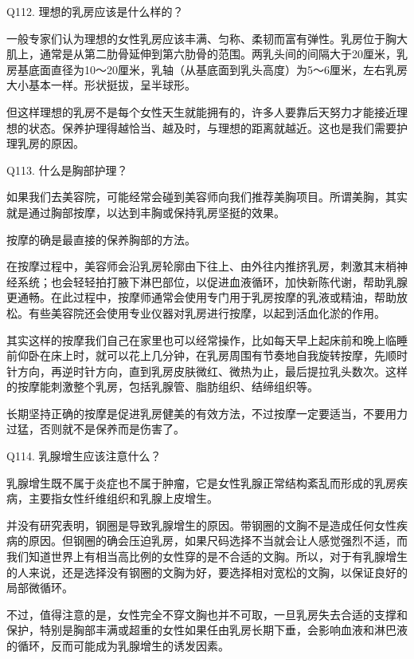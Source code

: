 \documentclass[12pt,UTF8]{ctexbook}
\begin{document}
Q112. 理想的乳房应该是什么样的？


一般专家们认为理想的女性乳房应该丰满、匀称、柔韧而富有弹性。乳房位于胸大肌上，通常是从第二肋骨延伸到第六肋骨的范围。两乳头间的间隔大于20厘米，乳房基底面直径为10～20厘米，乳轴（从基底面到乳头高度）为5～6厘米，左右乳房大小基本一样。形状挺拔，呈半球形。

但这样理想的乳房不是每个女性天生就能拥有的，许多人要靠后天努力才能接近理想的状态。保养护理得越恰当、越及时，与理想的距离就越近。这也是我们需要护理乳房的原因。





Q113. 什么是胸部护理？


如果我们去美容院，可能经常会碰到美容师向我们推荐美胸项目。所谓美胸，其实就是通过胸部按摩，以达到丰胸或保持乳房坚挺的效果。

按摩的确是最直接的保养胸部的方法。

在按摩过程中，美容师会沿乳房轮廓由下往上、由外往内推挤乳房，刺激其末梢神经系统；也会轻轻拍打腋下淋巴部位，以促进血液循环，加快新陈代谢，帮助乳腺更通畅。在此过程中，按摩师通常会使用专门用于乳房按摩的乳液或精油，帮助放松。有些美容院还会使用专业仪器对乳房进行按摩，以起到活血化淤的作用。

其实这样的按摩我们自己在家里也可以经常操作，比如每天早上起床前和晚上临睡前仰卧在床上时，就可以花上几分钟，在乳房周围有节奏地自我旋转按摩，先顺时针方向，再逆时针方向，直到乳房皮肤微红、微热为止，最后提拉乳头数次。这样的按摩能刺激整个乳房，包括乳腺管、脂肪组织、结缔组织等。

长期坚持正确的按摩是促进乳房健美的有效方法，不过按摩一定要适当，不要用力过猛，否则就不是保养而是伤害了。





Q114. 乳腺增生应该注意什么？


乳腺增生既不属于炎症也不属于肿瘤，它是女性乳腺正常结构紊乱而形成的乳房疾病，主要指女性纤维组织和乳腺上皮增生。

并没有研究表明，钢圈是导致乳腺增生的原因。带钢圈的文胸不是造成任何女性疾病的原因。但钢圈的确会压迫乳房，如果尺码选择不当就会让人感觉强烈不适，而我们知道世界上有相当高比例的女性穿的是不合适的文胸。所以，对于有乳腺增生的人来说，还是选择没有钢圈的文胸为好，要选择相对宽松的文胸，以保证良好的局部微循环。

不过，值得注意的是，女性完全不穿文胸也并不可取，一旦乳房失去合适的支撑和保护，特别是胸部丰满或超重的女性如果任由乳房长期下垂，会影响血液和淋巴液的循环，反而可能成为乳腺增生的诱发因素。
\end{document}
